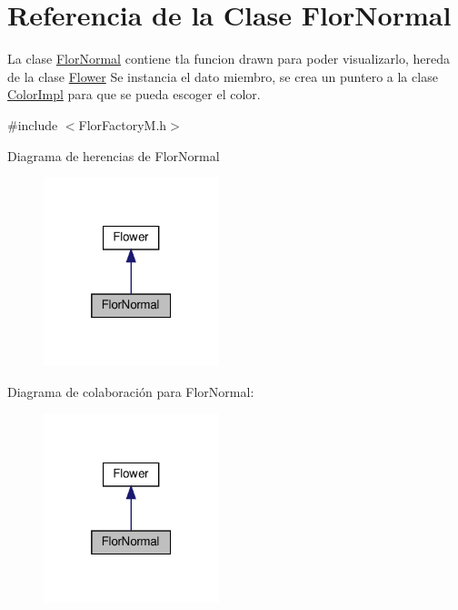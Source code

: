 \hypertarget{classFlorNormal}{}\section{Referencia de la Clase Flor\+Normal}
\label{classFlorNormal}


La clase \hyperlink{classFlorNormal}{Flor\+Normal} contiene tla funcion drawn para poder visualizarlo, hereda de la clase \hyperlink{classFlower}{Flower}  Se instancia el dato miembro, se crea un puntero a la clase \hyperlink{classColorImpl}{Color\+Impl} para que se pueda escoger el color.  




{\ttfamily \#include $<$Flor\+Factory\+M.\+h$>$}



Diagrama de herencias de Flor\+Normal
\nopagebreak
\begin{figure}[H]
\begin{center}
\leavevmode
\includegraphics[width=145pt]{classFlorNormal__inherit__graph}
\end{center}
\end{figure}


Diagrama de colaboración para Flor\+Normal\+:
\nopagebreak
\begin{figure}[H]
\begin{center}
\leavevmode
\includegraphics[width=145pt]{classFlorNormal__coll__graph}
\end{center}
\end{figure}
